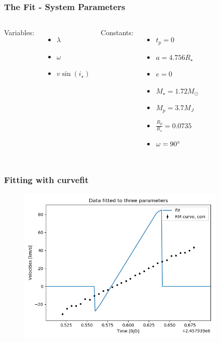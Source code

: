 \documentclass[show notes]{beamer}
\begin{document}
\begin{frame}
\frametitle{The Fit - System Parameters}
\begin{columns}
	Variables:
	\begin{itemize}
	\item $\lambda$
	\item $\omega$
	\item $v \sin(i_\star)$
	\end{itemize}
	Constants:
	\begin{itemize}
	\item $t_p = 0$
	\item $a = 4.756 R_\star$
	\item $e = 0$
	\item $M_\star = 1.72 M_\odot$
	\item $M_p = 3.7 M_J$
	\item $\frac{R_p}{R_\star} = 0.0735$
	\item $\omega = 90 \degree$
	\end{itemize}
\end{columns}
\end{frame}

\begin{frame}
\frametitle{Fitting with curvefit}
\begin{figure}
	\centering
	\includegraphics[width=0.9\textwidth]{../figures/first_fit1.png}
\end{figure}
\end{frame}
\end{document}
